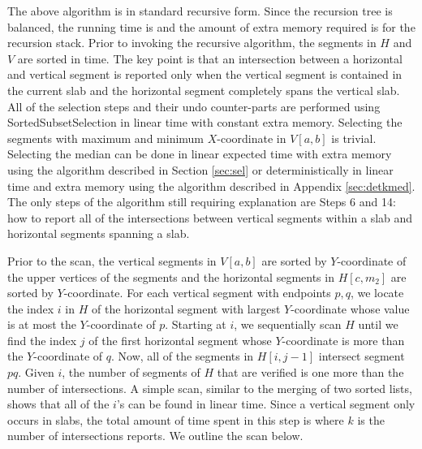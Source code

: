 The above algorithm is in standard recursive form. Since the recursion tree is balanced, the running time is  
and the amount of extra memory
required is  for the recursion stack. Prior to invoking the recursive algorithm, the segments in $H$ and $V$ are sorted 
in  time. The key point is that an intersection between a horizontal and vertical segment is
reported only when the vertical segment is contained in the current slab and the horizontal segment completely spans the vertical slab.
All of the selection steps and their undo counter-parts are performed using SortedSubsetSelection in linear time with
constant extra memory. Selecting the
segments with maximum and minimum $X$-coordinate in $V[a,b]$ is trivial. Selecting the median can be done in linear expected time with 
extra memory using the algorithm described in Section \ref{sec:sel} or deterministically in linear time and  extra memory using
the algorithm described in Appendix \ref{sec:detkmed}.
The only steps of the algorithm still requiring explanation are Steps 6 and 14: how to report all of the intersections between vertical
segments within a slab and horizontal segments spanning a slab.

Prior to the scan, the vertical segments in $V[a,b]$ are sorted
by $Y$-coordinate of the upper vertices of the segments and the
horizontal segments in $H[c,m_2]$ are sorted by $Y$-coordinate. For
each vertical segment with endpoints $p,q$, we locate the index $i$
in $H$ of the horizontal segment with largest $Y$-coordinate whose
value is at most the $Y$-coordinate of $p$.  Starting at $i$, we
sequentially scan $H$ until we find the index $j$ of the first
horizontal segment whose $Y$-coordinate is more than the $Y$-coordinate
of $q$. Now, all of the segments in $H[i,j-1]$ intersect segment
$pq$. Given $i$, the number of segments of $H$ that are verified
is one more than the number of intersections. A simple scan, similar to the
merging of two sorted lists, shows that all of the $i$'s can be found in linear time.
Since a vertical segment only occurs in  slabs, the total amount of time
spent in this step is  where $k$ is the number of intersections reports.
We outline the scan below.

